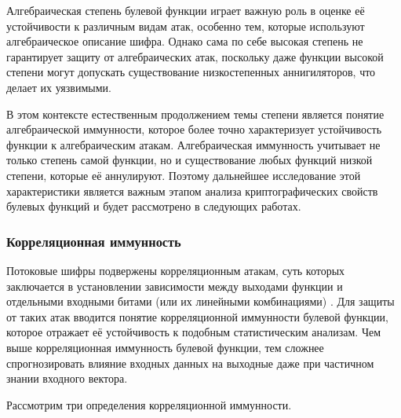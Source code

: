 Алгебраическая степень булевой функции играет важную роль в оценке её устойчивости к различным видам атак, особенно тем, которые используют алгебраическое описание шифра. Однако сама по себе высокая степень не гарантирует защиту от алгебраических атак, поскольку даже функции высокой степени могут допускать существование низкостепенных аннигиляторов, что делает их уязвимыми.

В этом контексте естественным продолжением темы степени является понятие алгебраической иммунности, которое более точно характеризует устойчивость функции к алгебраическим атакам. Алгебраическая иммунность учитывает не только степень самой функции, но и существование любых функций низкой степени, которые её аннулируют. Поэтому дальнейшее исследование этой характеристики является важным этапом анализа криптографических свойств булевых функций и будет рассмотрено в следующих работах.
\subsubsection{Корреляционная иммунность}
Потоковые шифры подвержены корреляционным атакам, суть которых заключается в установлении зависимости между выходами функции и отдельными входными битами (или их линейными комбинациями) \cite{Tarannikov}. Для защиты от таких атак вводится понятие корреляционной иммунности булевой функции, которое отражает её устойчивость к подобным статистическим анализам. Чем выше корреляционная иммунность булевой функции, тем сложнее спрогнозировать влияние входных данных на выходные даже при частичном знании входного вектора. 

Рассмотрим три определения корреляционной иммунности. 

